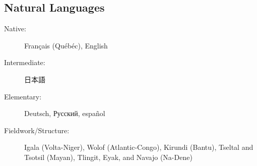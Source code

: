 \documentclass[margin,line]{resume}
\begin{document}
\begin{resume}


	\vspace{-0.9em}

	\section{\mysidestyle Natural Languages}\vspace{2mm}
	\begin{description}
		\item[Native:] Français (Qu\'{e}b\'{e}c), English
		\item[Intermediate:] \begin{CJK}{UTF8}{min}日本語\end{CJK}
		\item[Elementary:] Deutsch, Русский, español
		\item[Fieldwork/Structure:] Igala (Volta-Niger), Wolof (Atlantic-Congo), Kirundi (Bantu),
		      Tseltal and Tsotsil (Mayan), Tlingit, Eyak, and Navajo (Na-Dene)%
	\end{description}

	\BgThispage

\end{resume}
\end{document}
